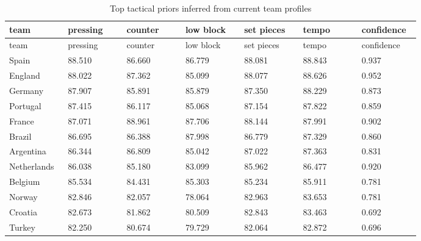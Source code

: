 \documentclass[10pt]{article}
\begin{document}
\begin{longtable}{p{0.134\linewidth}p{0.134\linewidth}p{0.134\linewidth}p{0.134\linewidth}p{0.134\linewidth}p{0.134\linewidth}p{0.134\linewidth}}
\caption{Top tactical priors inferred from current team profiles}\\
\toprule
team & pressing & counter & low block & set pieces & tempo & confidence \\
\midrule
\endfirsthead
\toprule
team & pressing & counter & low block & set pieces & tempo & confidence \\
\midrule
\endhead
Spain & 88.510 & 86.660 & 86.779 & 88.081 & 88.843 & 0.937 \\
England & 88.022 & 87.362 & 85.099 & 88.077 & 88.626 & 0.952 \\
Germany & 87.907 & 85.891 & 85.879 & 87.350 & 88.229 & 0.873 \\
Portugal & 87.415 & 86.117 & 85.068 & 87.154 & 87.822 & 0.859 \\
France & 87.071 & 88.961 & 87.706 & 88.144 & 87.991 & 0.902 \\
Brazil & 86.695 & 86.388 & 87.998 & 86.779 & 87.329 & 0.860 \\
Argentina & 86.344 & 86.809 & 85.042 & 87.022 & 87.363 & 0.831 \\
Netherlands & 86.038 & 85.180 & 83.099 & 85.962 & 86.477 & 0.920 \\
Belgium & 85.534 & 84.431 & 85.303 & 85.234 & 85.911 & 0.781 \\
Norway & 82.846 & 82.057 & 78.064 & 82.963 & 83.653 & 0.781 \\
Croatia & 82.673 & 81.862 & 80.509 & 82.843 & 83.463 & 0.692 \\
Turkey & 82.250 & 80.674 & 79.729 & 82.064 & 82.872 & 0.696 \\
\bottomrule
\end{longtable}
\end{document}
